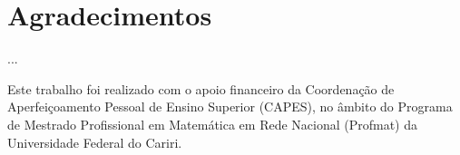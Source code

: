 \chapter*{Agradecimentos}

...

Este trabalho foi realizado com o apoio financeiro da Coordenação de Aperfeiçoamento Pessoal de Ensino Superior (CAPES), no âmbito do Programa de Mestrado Profissional em Matemática em Rede Nacional (Profmat) da Universidade Federal do Cariri.